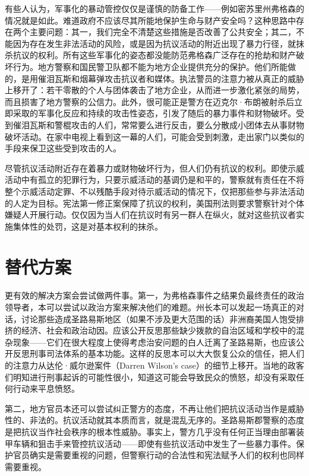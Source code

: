 \documentclass[fontset=fandol, a4paper, 12pt, openright]{ctexbook}
\begin{document}
有些人认为，军事化的暴动管控仅仅是谨慎的防备工作——例如密苏里州弗格森的情况就是如此。难道政府不应该尽其所能地保护生命与财产安全吗？这种思路中存在两个主要问题：其一，我们完全不清楚这些措施是否改善了公共安全；其二，不能因为存在发生非法活动的风险，或是因为抗议活动的附近出现了暴力行径，就抹杀抗议的权利。所有这些军事化的姿态都没能防范弗格森广泛存在的抢劫和财产破坏行为。地方警察和国民警卫队都不能为地方企业提供充分的保护。他们所能做的，是用催泪瓦斯和烟幕弹攻击抗议者和媒体。执法警员的注意力被从真正的威胁上移开了：若干零散的个人与团体袭击了地方企业，从而进一步激化紧张的局势，而且损害了地方警察的公信力。此外，很可能正是警方在迈克尔·布朗被射杀后立即采取的军事化反应和持续的攻击性姿态，引发了随后的暴力事件和财物破坏。受到催泪瓦斯和警棍攻击的人们，常常要么进行反击，要么分散成小团体去从事财物破坏活动。在家中电视上看到这一幕的人们，可能会受到刺激，走出家门以类似的手段来保卫这些受到攻击的人。

尽管抗议活动附近存在着暴力或财物破坏行为，但人们仍有抗议的权利。即使示威活动中有孤立的犯罪行为，只要示威活动的基调仍是和平的，警察就有责任在不将整个示威活动定罪、不以残酷手段对待示威活动的情况下，仅把那些参与非法活动的人定为目标。宪法第一修正案保障了抗议的权利，美国刑法则要求警察针对个体嫌疑人开展行动。仅仅因为当人们在抗议时有另一群人在纵火，就对这些抗议者实施集体性的处罚，这是对基本权利的抹杀。

\section{替代方案}

更有效的解决方案会尝试做两件事。第一，为弗格森事件之结果负最终责任的政治领导者，本可以尝试以政治方案来解决他们的难题。州长本可以发起一场真正的对话，讨论那些造成圣路易斯地区（如果不涉及更大范围的话）非洲裔美国人饱受排挤的经济、社会和政治动因。应该公开反思那些缺少拨款的自治区域和学校中的混杂现象——它们在很大程度上使得考虑治安问题的白人迁离了圣路易斯，也应该公开反思刑事司法体系的基本功能。这样的反思本可以大大恢复公众的信任，把人们的注意力从达伦·威尔逊案件（Darren Wilson's case）的细节上移开。当地的政客们明知进行刑事起诉的可能性很小，知道这可能会导致民众的愤怒，却没有采取任何行动来平息愤怒。

第二，地方官员本还可以尝试纠正警方的态度，不再让他们把抗议活动当作是威胁性的、非法的。抗议活动就其本质而言，就是混乱无序的。圣路易斯郡警察的态度是把抗议当作社会秩序的根本性威胁。事实上，警方几乎没有任何正当理由部署装甲车辆和狙击手来管控抗议活动——即使有些抗议活动中发生了一些暴力事件。保护官员确实是需要重视的问题，但警察行动的合法性和宪法赋予人们的权利也同样需要重视。
\end{document}
